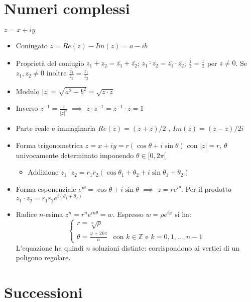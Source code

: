 \documentclass[10pt, oneside]{book}
\theoremstyle{plain}
\begin{document}
\chapter{Numeri complessi}
$z = x + iy$
\begin{itemize}
    \item Coniugato $\overline{z} = Re (z) - Im (z) = a -ib$
    \item Proprietà del coniugio $\overline{z_1 + z_2} = \overline{z_1} + \overline{z_2}$; $\overline{z_1 \cdot z_2} = \overline{z_1} \cdot \overline{z_2}$; $\overline{\frac{1}{z}} = \frac{1}{\overline{z}}$ per $z \neq 0$. Se $z_1, z_2 \neq 0$ inoltre $\overline{\frac{z_1}{z_2}} = \frac{\overline{z_1}}{\overline{z_2}}$
    \item Modulo $|z| = \sqrt{a^2 + b^2} = \sqrt{z \cdot \overline{z}}$
    \item Inverso $z^{-1} = \frac{\overline{z}}{|z|^2}$ $\implies$ $z \cdot z^{-1} = z^{-1} \cdot z = 1$
    \item Parte reale e immaginaria $Re(z) = (z + \overline{z}) / 2$ , $Im (z) = (z - \overline{z}) / 2i$
    \item Forma trigonometrica $z = x + iy = r (\cos \theta + i \sin \theta)$ con $|z| = r$, $\theta$ univocamente determinato imponendo $\theta \in [0, 2\pi[$
    \begin{itemize}[label = $\ast$]
        \item Addizione $z_1 \cdot z_2 = r_1 r_2 (\cos{\theta_1 + \theta_2} + i \sin{\theta_1 + \theta_2})$
    \end{itemize}
    \item Forma esponenziale $e^{i \theta} = \cos \theta + i \sin \theta$ $\implies$ $z = r e^{i\theta}$. Per il prodotto $z_1 \cdot z_2 = r_1 r_2 e^{i (\theta_1 + \theta_2)}$
    \item Radice $n$-esima $z^n = r^n e^{i n\theta} = w$. Espresso $w = \rho e^{i \varphi}$ si ha:
    \[\begin{cases}
        r = \sqrt[n]{\rho} \\
        \theta = \frac{\varphi + 2 k \pi}{n} & \textrm{con $k \in \mathbb{Z}$ e $k = 0, 1, ..., n-1$}
    \end{cases}\]
    L'equazione ha quindi $n$ soluzioni distinte: corrispondono ai vertici di un poligono regolare.
\end{itemize}

\chapter{Successioni}
\end{document}
